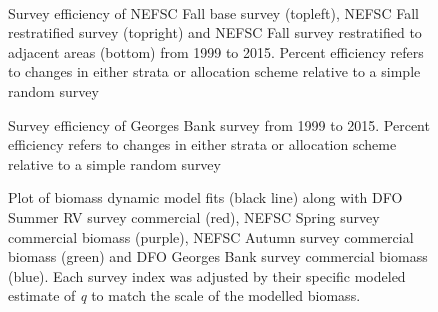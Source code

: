 \documentclass[11pt]{article}
\newcommand{\e}{/backup/bio_data/bio.lobster/figures/} %
\newcommand{\spm}{/backup/bio_data/bio.lobster/spmodelling/lfa41/}
\begin{document}
        \begin{figure}
        \centering
        \\
        \caption{Survey efficiency of NEFSC Fall base survey (topleft), NEFSC Fall restratified survey (topright) and NEFSC Fall survey restratified to adjacent areas (bottom) from 1999 to 2015. Percent efficiency refers to changes in either strata or allocation scheme relative to a simple random survey }
        \end{figure}
        \clearpage



        \begin{figure}
        \centering
        \caption{Survey efficiency of Georges Bank survey from 1999 to 2015. Percent efficiency refers to changes in either strata or allocation scheme relative to a simple random survey }
        \end{figure}
        \clearpage



\begin{figure}
\centering
        \caption{Plot of biomass dynamic model fits (black line) along with DFO Summer RV survey commercial (red), NEFSC Spring survey commercial biomass (purple), NEFSC Autumn survey commercial biomass (green) and DFO Georges Bank survey commercial biomass (blue). Each survey index was adjusted by their specific modeled estimate of \emph{q} to match the scale of the modelled biomass.}


\end{figure}
\end{document}
